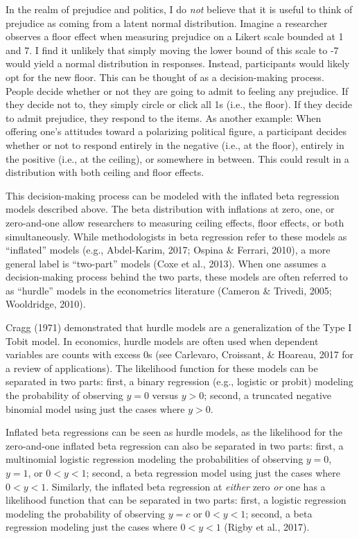 \documentclass[english,man]{apa6}
\theoremstyle{definition}
\theoremstyle{definition}
\theoremstyle{remark}
\begin{document}
In the realm of prejudice and politics, I do \emph{not} believe that it
is useful to think of prejudice as coming from a latent normal
distribution. Imagine a researcher observes a floor effect when
measuring prejudice on a Likert scale bounded at 1 and 7. I find it
unlikely that simply moving the lower bound of this scale to -7 would
yield a normal distribution in responses. Instead, participants would
likely opt for the new floor. This can be thought of as a
decision-making process. People decide whether or not they are going to
admit to feeling any prejudice. If they decide not to, they simply
circle or click all 1s (i.e., the floor). If they decide to admit
prejudice, they respond to the items. As another example: When offering
one's attitudes toward a polarizing political figure, a participant
decides whether or not to respond entirely in the negative (i.e., at the
floor), entirely in the positive (i.e., at the ceiling), or somewhere in
between. This could result in a distribution with both ceiling and floor
effects.

This decision-making process can be modeled with the inflated beta
regression models described above. The beta distribution with inflations
at zero, one, or zero-and-one allow researchers to measuring ceiling
effects, floor effects, or both simultaneously. While methodologists in
beta regression refer to these models as \enquote{inflated} models
(e.g., Abdel-Karim, 2017; Ospina \& Ferrari, 2010), a more general label
is \enquote{two-part} models (Coxe et al., 2013). When one assumes a
decision-making process behind the two parts, these models are often
referred to as \enquote{hurdle} models in the econometrics literature
(Cameron \& Trivedi, 2005; Wooldridge, 2010).

Cragg (1971) demonstrated that hurdle models are a generalization of the
Type I Tobit model. In economics, hurdle models are often used when
dependent variables are counts with excess 0s (see Carlevaro, Croissant,
\& Hoareau, 2017 for a review of applications). The likelihood function
for these models can be separated in two parts: first, a binary
regression (e.g., logistic or probit) modeling the probability of
observing \(y = 0\) versus \(y > 0\); second, a truncated negative
binomial model using just the cases where \(y > 0\).

Inflated beta regressions can be seen as hurdle models, as the
likelihood for the zero-and-one inflated beta regression can also be
separated in two parts: first, a multinomial logistic regression
modeling the probabilities of observing \(y = 0\), \(y = 1\), or
\(0 < y < 1\); second, a beta regression model using just the cases
where \(0 < y < 1\). Similarly, the inflated beta regression at
\emph{either} zero \emph{or} one has a likelihood function that can be
separated in two parts: first, a logistic regression modeling the
probability of observing \(y = c\) or \(0 < y < 1\); second, a beta
regression modeling just the cases where \(0 < y < 1\) (Rigby et al.,
2017).
\end{document}
